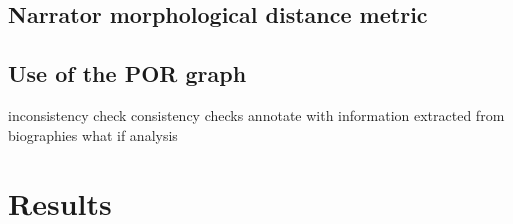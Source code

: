 \documentclass[11pt]{article}
\begin{document}
\subsection{Narrator morphological distance metric}

\subsection{Use of the POR graph}
inconsistency check 
consistency checks
annotate with information extracted from biographies
what if analysis


\section{Results}
\label{sec:results}

%
\end{document}
